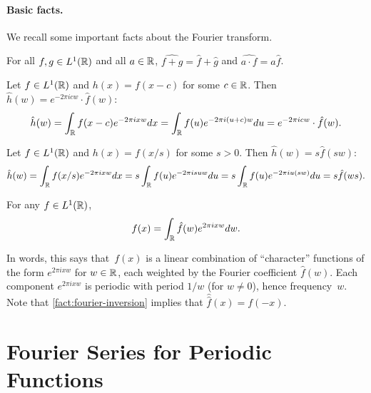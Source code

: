 \documentclass[11pt]{article}
\begin{document}
 

\paragraph{Basic facts.}

We recall some important facts about the Fourier transform.

\begin{fact}[Linearity]
  \label{fact:linear}
  For all $f,g \in L^1(\mathbb{R})$ and all $a \in \mathbb{R}$,
  $\widehat{f + g} = \hat{f} + \hat{g}$ and
  $\widehat{a \cdot f} = a\hat{f}$.
\end{fact}

\begin{fact}
  \label{fact:shift}
  Let $f \in L^{1}(\mathbb{R})$ and $h(x) = f(x - c)$ for some $c \in \mathbb{R}$.
  Then $\hat{h}(w) = e^{-2\pi i c w} \cdot \hat{f}(w)$:
  \[ \hat{h}(w) = \int_{\mathbb{R}} f(x-c)e^{-2\pi i xw}dx = \int_{\mathbb{R}} f(u)
    e^{-2\pi i(u + c)w} du = e^{-2\pi i c w} \cdot \hat{f}(w) . \]
\end{fact}

\begin{fact}
  \label{fact:scale}
  Let $f \in L^{1}(\mathbb{R})$ and $h(x) = f(x/s)$ for some $s > 0$. Then
  $\hat{h}(w) = s \hat{f}(s w)$:
  \[ \hat{h}(w) = \int_{\mathbb{R}} f(x/s) e^{-2\pi i x w} dx = s
    \int_{\mathbb{R}} f(u) e^{-2\pi i s u w} du = s \int_{\mathbb{R}}
    f(u) e^{-2\pi i u (s w)} du = s \hat{f}(ws) . \]
\end{fact}

\begin{fact}
  \label{fact:fourier-inversion}
  For any $f \in L^{1}(\mathbb{R})$,
  \[ f(x) = \int_{\mathbb{R}} \hat{f}(w) e^{2\pi i x w} dw . \]
\end{fact}
In words, this says that~$f(x)$ is a linear combination of
``character'' functions of the form $e^{2\pi i x w}$ for $w \in \mathbb{R}$,
each weighted by the Fourier coefficient $\hat{f}(w)$. Each component
$e^{2\pi i x w}$ is periodic with period $1/w$ (for $w \neq 0$), hence
frequency~$w$. Note that \cref{fact:fourier-inversion} implies that
$\hat{\hat{f}}(x) = f(-x)$.

\section{Fourier Series for Periodic Functions}
\label{sec:fseries}
\end{document}
